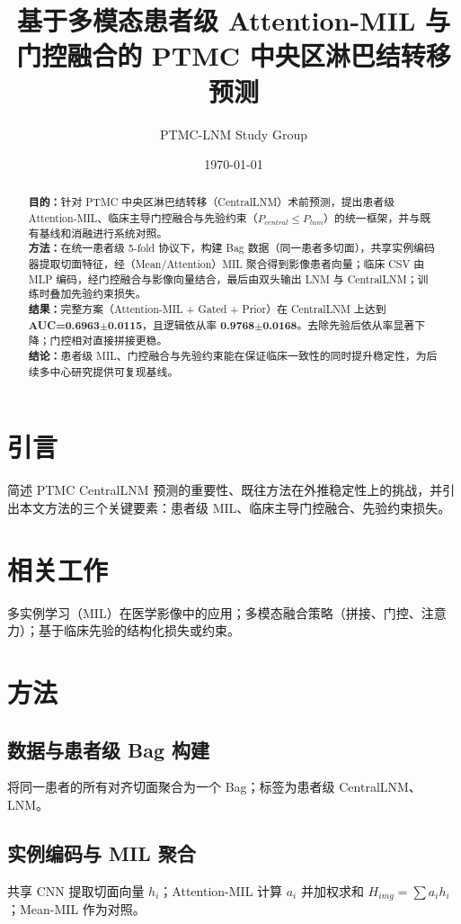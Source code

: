 \documentclass[12pt,a4paper]{ctexart}
\title{基于多模态患者级 Attention-MIL 与门控融合的 PTMC 中央区淋巴结转移预测}
\author{PTMC-LNM Study Group}
\date{\today}
\begin{document}
\maketitle

\begin{abstract}
\textbf{目的：}针对 PTMC 中央区淋巴结转移（CentralLNM）术前预测，提出患者级 Attention-MIL、临床主导门控融合与先验约束（$P_{central}\le P_{lnm}$）的统一框架，并与既有基线和消融进行系统对照。\\
\textbf{方法：}在统一患者级 5-fold 协议下，构建 Bag 数据（同一患者多切面），共享实例编码器提取切面特征，经（Mean/Attention）MIL 聚合得到影像患者向量；临床 CSV 由 MLP 编码，经门控融合与影像向量结合，最后由双头输出 LNM 与 CentralLNM；训练时叠加先验约束损失。\\
\textbf{结果：}完整方案（Attention-MIL + Gated + Prior）在 CentralLNM 上达到 \textbf{AUC=0.6963$\pm$0.0115}，且逻辑依从率 \textbf{0.9768$\pm$0.0168}。去除先验后依从率显著下降；门控相对直接拼接更稳。\\
\textbf{结论：}患者级 MIL、门控融合与先验约束能在保证临床一致性的同时提升稳定性，为后续多中心研究提供可复现基线。
\end{abstract}

\tableofcontents
\newpage

\section{引言}
简述 PTMC CentralLNM 预测的重要性、既往方法在外推稳定性上的挑战，并引出本文方法的三个关键要素：患者级 MIL、临床主导门控融合、先验约束损失。

\section{相关工作}
多实例学习（MIL）在医学影像中的应用；多模态融合策略（拼接、门控、注意力）；基于临床先验的结构化损失或约束。

\section{方法}
\subsection{数据与患者级 Bag 构建}
将同一患者的所有对齐切面聚合为一个 Bag；标签为患者级 CentralLNM、LNM。
\subsection{实例编码与 MIL 聚合}
共享 CNN 提取切面向量 $h_i$；Attention-MIL 计算 $a_i$ 并加权求和 $H_{img}=\sum a_i h_i$；Mean-MIL 作为对照。
\end{document}
